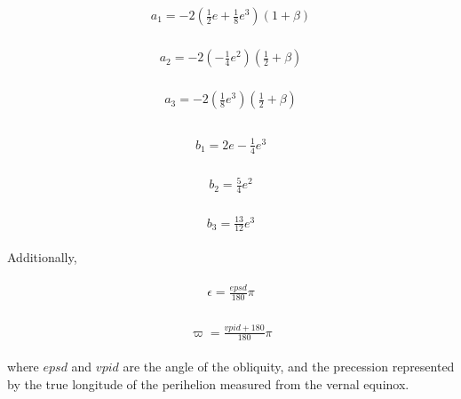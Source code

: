 \begin{eqnarray}
\begin{array}{l}
a_{1}=-2\left(\frac{1}{2} e+\frac{1}{8} e^{3}\right)(1+\beta)
\end{array}
\end{eqnarray}

\begin{eqnarray}
\begin{array}{l}
a_{2}=-2\left(-\frac{1}{4} e^{2}\right)\left(\frac{1}{2}+\beta\right)
\end{array}
\end{eqnarray}

\begin{eqnarray}
\begin{array}{l}
a_{3}=-2\left(\frac{1}{8} e^{3}\right)\left(\frac{1}{2}+\beta\right) \\
\end{array}
\end{eqnarray}

\begin{eqnarray}
\begin{array}{l}
b_{1}=2 e-\frac{1}{4} e^{3}
\end{array}
\end{eqnarray}

\begin{eqnarray}
\begin{array}{l}
b_{2}=\frac{5}{4} e^{2}
\end{array}
\end{eqnarray}

\begin{eqnarray}
\begin{array}{l}
b_{3}=\frac{13}{12} e^{3}
\end{array}
\end{eqnarray}

Additionally,

\begin{eqnarray}
\begin{array}{l}
\epsilon=\frac{e p s d}{180} \pi
\end{array}
\end{eqnarray}

\begin{eqnarray}
\begin{array}{l}
\varpi=\frac{v p i d+180}{180} \pi
\end{array}
\end{eqnarray}

where \(epsd\) and \(vpid\) are the angle of the obliquity, and the
precession represented by the true longitude of the perihelion measured
from the vernal equinox.

